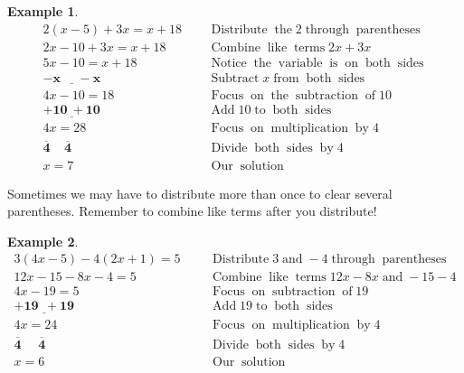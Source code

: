 \documentclass[12pt]{book}
\theoremstyle{definition}
\newtheorem{example}{Example}
\newcommand{\tmmathbf}[1]{\ensuremath{\boldsymbol{#1}}}
\newcommand{\tmop}[1]{\ensuremath{\operatorname{#1}}}
\begin{document}
\begin{example}\label{Lin24}
  \begin{eqnarray*}
    2 (x - 5) + 3 x = x + 18~~ &  & \tmop{Distribute} \tmop{the} 2
    \tmop{through} \tmop{parentheses}\\
    2 x - 10 + 3 x = x + 18~~ &  & \tmop{Combine} \tmop{like} \tmop{terms} 2 x +
    3 x\\
    5 x - 10 = x + 18~~ &  & \tmop{Notice} \tmop{the} \tmop{variable} \tmop{is}
    \tmop{on} \tmop{both} \tmop{sides}\\
    \tmmathbf{\underline{- x ~~~~~~- x}}~~~~~~~~  &  & \tmop{Subtract} x \tmop{from}
    \tmop{both} \tmop{sides}\\
    4 x - 10 = 18~~ &  & \tmop{Focus} \tmop{on} \tmop{the} \tmop{subtraction}
    \tmop{of} 10\\
    \tmmathbf{\underline{+ 10 ~+10}}  &  & \tmop{Add} 10 \tmop{to} \tmop{both}
    \tmop{sides}\\
    4 x = 28~~ &  & \tmop{Focus} \tmop{on} \tmop{multiplication} \tmop{by} 4\\
    \tmmathbf{ \overline{4} ~~~~~ \overline{4}}~~~  &  & \tmop{Divide} \tmop{both}
    \tmop{sides} \tmop{by} 4\\
    x = 7~~ &  & \tmop{Our} \tmop{solution}
  \end{eqnarray*}
\end{example}
Sometimes we may have to distribute more than once to clear several parentheses. Remember to combine like terms after you distribute!
\begin{example}\label{Lin25}
  \begin{eqnarray*}
    3 (4 x - 5) - 4 (2 x + 1) = 5~~~ &  & \tmop{Distribute} 3 \tmop{and} - 4
    \tmop{through} \tmop{parentheses}\\
    12 x - 15 - 8 x - 4 = 5~~~ &  & \tmop{Combine} \tmop{like} \tmop{terms} 12 x
    - 8 x \tmop{and} - 15 - 4\\
    4 x - 19 = 5~~~ &  & \tmop{Focus} \tmop{on} \tmop{subtraction} \tmop{of} 19\\
    \underline{\tmmathbf{+ 19 ~~+ 19}} &  & \tmop{Add} 19 \tmop{to} \tmop{both}
    \tmop{sides}\\
    4 x = 24~~~ &  & \tmop{Focus} \tmop{on} \tmop{multiplication} \tmop{by} 4\\
    \tmmathbf{\overline{4} ~~~~~~ \overline{4}}~~~ &  & \tmop{Divide} \tmop{both}
    \tmop{sides} \tmop{by} 4\\
    x = 6~~~ &  & \tmop{Our} \tmop{solution}
  \end{eqnarray*}
\end{example}
\end{document}
